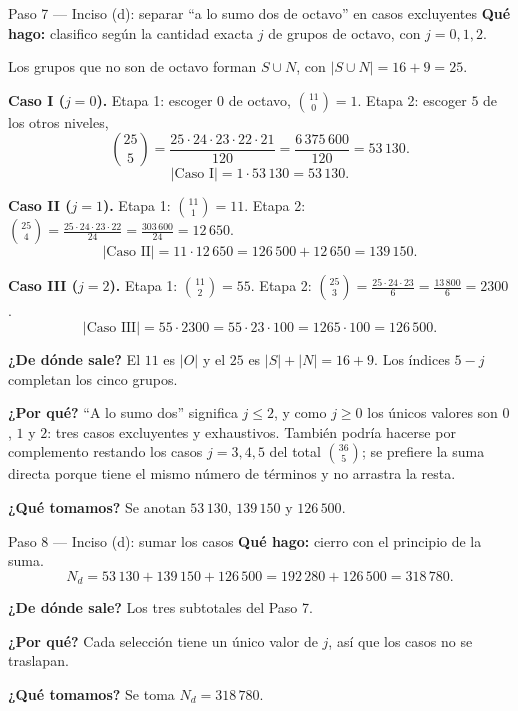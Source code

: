 \documentclass[11pt]{article}
\begin{document}
\begin{paso}{Paso 7 --- Inciso (d): separar ``a lo sumo dos de octavo'' en casos excluyentes}
\textbf{Qué hago:} clasifico según la cantidad exacta $j$ de grupos de octavo, con $j=0,1,2$.

Los grupos que no son de octavo forman $S\cup N$, con $|S\cup N| = 16+9 = 25$.

\medskip
\textbf{Caso I ($j=0$).} Etapa 1: escoger $0$ de octavo, $\binom{11}{0}=1$. Etapa 2: escoger $5$ de los otros niveles,
\[
  \binom{25}{5}=\frac{25\cdot 24\cdot 23\cdot 22\cdot 21}{120} = \frac{6\,375\,600}{120} = 53\,130 .
\]
\[
  |\text{Caso I}| = 1\cdot 53\,130 = 53\,130 .
\]

\textbf{Caso II ($j=1$).} Etapa 1: $\binom{11}{1}=11$. Etapa 2: $\binom{25}{4}=\frac{25\cdot 24\cdot 23\cdot 22}{24}=\frac{303\,600}{24}=12\,650$.
\[
  |\text{Caso II}| = 11\cdot 12\,650 = 126\,500 + 12\,650 = 139\,150 .
\]

\textbf{Caso III ($j=2$).} Etapa 1: $\binom{11}{2}=55$. Etapa 2: $\binom{25}{3}=\frac{25\cdot 24\cdot 23}{6}=\frac{13\,800}{6}=2300$.
\[
  |\text{Caso III}| = 55\cdot 2300 = 55\cdot 23\cdot 100 = 1265\cdot 100 = 126\,500 .
\]

\textbf{¿De dónde sale?} El $11$ es $|O|$ y el $25$ es $|S|+|N|=16+9$. Los índices $5-j$ completan los cinco grupos.

\textbf{¿Por qué?} ``A lo sumo dos'' significa $j\le 2$, y como $j\ge 0$ los únicos valores son $0$, $1$ y $2$: tres casos excluyentes y exhaustivos. También podría hacerse por complemento restando los casos $j=3,4,5$ del total $\binom{36}{5}$; se prefiere la suma directa porque tiene el mismo número de términos y no arrastra la resta.

\textbf{¿Qué tomamos?} Se anotan $53\,130$, $139\,150$ y $126\,500$.
\end{paso}

\begin{paso}{Paso 8 --- Inciso (d): sumar los casos}
\textbf{Qué hago:} cierro con el principio de la suma.
\[
  N_d = 53\,130 + 139\,150 + 126\,500 = 192\,280 + 126\,500 = 318\,780 .
\]

\textbf{¿De dónde sale?} Los tres subtotales del Paso 7.

\textbf{¿Por qué?} Cada selección tiene un único valor de $j$, así que los casos no se traslapan.

\textbf{¿Qué tomamos?} Se toma $N_d = 318\,780$.
\end{paso}
\end{document}
